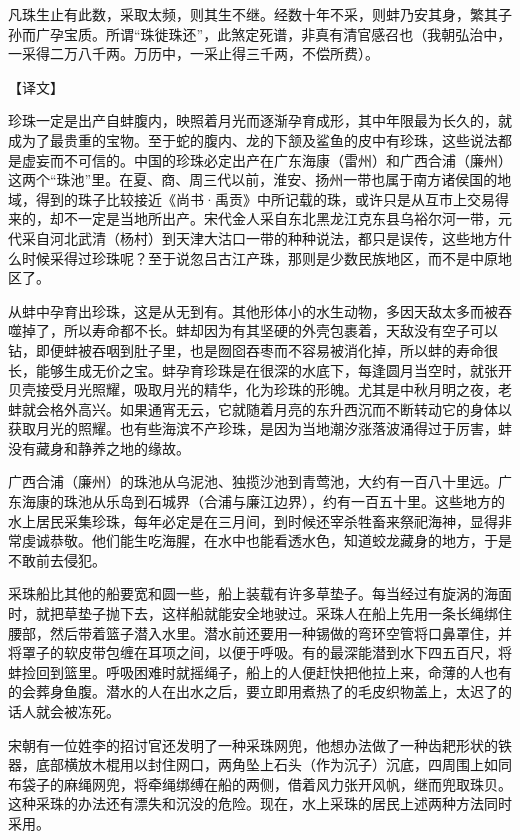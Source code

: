 \documentclass[12pt,UTF8]{ctexbook}
\begin{document}
凡珠生止有此数，采取太频，则其生不继。经数十年不采，则蚌乃安其身，繁其子孙而广孕宝质。所谓“珠徙珠还”，此煞定死谱，非真有清官感召也（我朝弘治中，一采得二万八千两。万历中，一采止得三千两，不偿所费）。

【译文】

珍珠一定是出产自蚌腹内，映照着月光而逐渐孕育成形，其中年限最为长久的，就成为了最贵重的宝物。至于蛇的腹内、龙的下颔及鲨鱼的皮中有珍珠，这些说法都是虚妄而不可信的。中国的珍珠必定出产在广东海康（雷州）和广西合浦（廉州）这两个“珠池”里。在夏、商、周三代以前，淮安、扬州一带也属于南方诸侯国的地域，得到的珠子比较接近《尚书·禹贡》中所记载的珠，或许只是从互市上交易得来的，却不一定是当地所出产。宋代金人采自东北黑龙江克东县乌裕尔河一带，元代采自河北武清（杨村）到天津大沽口一带的种种说法，都只是误传，这些地方什么时候采得过珍珠呢？至于说忽吕古江产珠，那则是少数民族地区，而不是中原地区了。

从蚌中孕育出珍珠，这是从无到有。其他形体小的水生动物，多因天敌太多而被吞噬掉了，所以寿命都不长。蚌却因为有其坚硬的外壳包裹着，天敌没有空子可以钻，即便蚌被吞咽到肚子里，也是囫囵吞枣而不容易被消化掉，所以蚌的寿命很长，能够生成无价之宝。蚌孕育珍珠是在很深的水底下，每逢圆月当空时，就张开贝壳接受月光照耀，吸取月光的精华，化为珍珠的形魄。尤其是中秋月明之夜，老蚌就会格外高兴。如果通宵无云，它就随着月亮的东升西沉而不断转动它的身体以获取月光的照耀。也有些海滨不产珍珠，是因为当地潮汐涨落波涌得过于厉害，蚌没有藏身和静养之地的缘故。

广西合浦（廉州）的珠池从乌泥池、独揽沙池到青莺池，大约有一百八十里远。广东海康的珠池从乐岛到石城界（合浦与廉江边界），约有一百五十里。这些地方的水上居民采集珍珠，每年必定是在三月间，到时候还宰杀牲畜来祭祀海神，显得非常虔诚恭敬。他们能生吃海腥，在水中也能看透水色，知道蛟龙藏身的地方，于是不敢前去侵犯。

采珠船比其他的船要宽和圆一些，船上装载有许多草垫子。每当经过有旋涡的海面时，就把草垫子抛下去，这样船就能安全地驶过。采珠人在船上先用一条长绳绑住腰部，然后带着篮子潜入水里。潜水前还要用一种锡做的弯环空管将口鼻罩住，并将罩子的软皮带包缠在耳项之间，以便于呼吸。有的最深能潜到水下四五百尺，将蚌捡回到篮里。呼吸困难时就摇绳子，船上的人便赶快把他拉上来，命薄的人也有的会葬身鱼腹。潜水的人在出水之后，要立即用煮热了的毛皮织物盖上，太迟了的话人就会被冻死。

宋朝有一位姓李的招讨官还发明了一种采珠网兜，他想办法做了一种齿耙形状的铁器，底部横放木棍用以封住网口，两角坠上石头（作为沉子）沉底，四周围上如同布袋子的麻绳网兜，将牵绳绑缚在船的两侧，借着风力张开风帆，继而兜取珠贝。这种采珠的办法还有漂失和沉没的危险。现在，水上采珠的居民上述两种方法同时采用。
\end{document}
